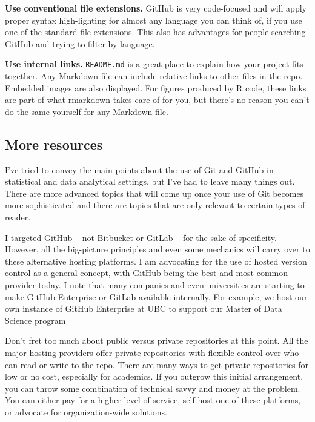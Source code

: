 \documentclass[12pt]{article}
\begin{document}
\textbf{Use conventional file extensions.} GitHub is very code-focused
and will apply proper syntax high-lighting for almost any language you
can think of, if you use one of the standard file extensions. This also
has advantages for people searching GitHub and trying to filter by
language.

\textbf{Use internal links.} \texttt{README.md} is a great place to
explain how your project fits together. Any Markdown file can include
relative links to other files in the repo. Embedded images are also
displayed. For figures produced by R code, these links are part of what
rmarkdown takes care of for you, but there's no reason you can't do the
same yourself for any Markdown file.

\subsection{More resources}\label{more-resources}

I've tried to convey the main points about the use of Git and GitHub in
statistical and data analytical settings, but I've had to leave many
things out. There are more advanced topics that will come up once your
use of Git becomes more sophisticated and there are topics that are only
relevant to certain types of reader.

I targeted \href{https://github.com}{GitHub} -- not
\href{https://bitbucket.org}{Bitbucket} or
\href{https://about.gitlab.com}{GitLab} -- for the sake of specificity.
However, all the big-picture principles and even some mechanics will
carry over to these alternative hosting platforms. I am advocating for
the use of hosted version control as a general concept, with GitHub
being the best and most common provider today. I note that many
companies and even universities are starting to make GitHub Enterprise
or GitLab available internally. For example, we host our own instance of
GitHub Enterprise at UBC to support our Master of Data Science program

Don't fret too much about public versus private repositories at this
point. All the major hosting providers offer private repositories with
flexible control over who can read or write to the repo. There are many
ways to get private repositories for low or no cost, especially for
academics. If you outgrow this initial arrangement, you can throw some
combination of technical savvy and money at the problem. You can either
pay for a higher level of service, self-host one of these platforms, or
advocate for organization-wide solutions.
\end{document}
